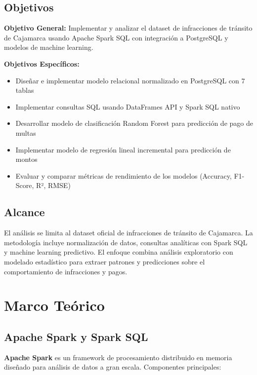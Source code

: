 \documentclass[12pt,a4paper]{article}
\begin{document}
\subsection{Objetivos}

\textbf{Objetivo General:} Implementar y analizar el dataset de infracciones de tránsito de Cajamarca usando Apache Spark SQL con integración a PostgreSQL y modelos de machine learning.

\textbf{Objetivos Específicos:}
\begin{itemize}
    \item Diseñar e implementar modelo relacional normalizado en PostgreSQL con 7 tablas
    \item Implementar consultas SQL usando DataFrames API y Spark SQL nativo
    \item Desarrollar modelo de clasificación Random Forest para predicción de pago de multas
    \item Implementar modelo de regresión lineal incremental para predicción de montos
    \item Evaluar y comparar métricas de rendimiento de los modelos (Accuracy, F1-Score, R², RMSE)
\end{itemize}

\subsection{Alcance}

El análisis se limita al dataset oficial de infracciones de tránsito de Cajamarca. La metodología incluye normalización de datos, consultas analíticas con Spark SQL y machine learning predictivo. El enfoque combina análisis exploratorio con modelado estadístico para extraer patrones y predicciones sobre el comportamiento de infracciones y pagos.

\section{Marco Teórico}

\subsection{Apache Spark y Spark SQL}

\textbf{Apache Spark} es un framework de procesamiento distribuido en memoria diseñado para análisis de datos a gran escala. Componentes principales:
\end{document}
